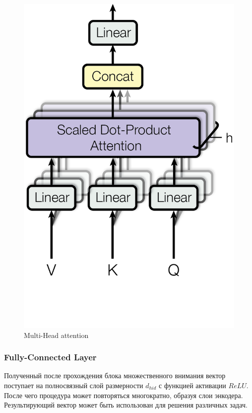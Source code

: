 \documentclass[diploma]{nanolab2015}
\begin{document}
\begin{figure}[ht]
    \centering
    \includegraphics[scale=0.2]{./assets/multi-head-self-attention.png}
    \caption{Multi-Head attention\cite{book10}}
    \label{pic4}
\end{figure}

\subsubsection{Fully-Connected Layer}
Полученный после прохождения блока множественного внимания вектор поступает на полносвязный слой размерности $d_{hid}$ с функцией активации $ReLU$. После чего процедура может повторяться многократно, образуя слои энкодера. Результирующий вектор может быть использован для решения различных задач.
\end{document}
